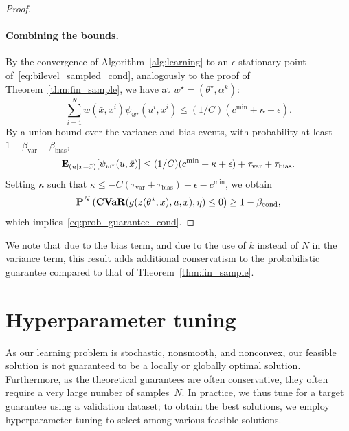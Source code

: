 \documentclass[11pt]{article}
\begin{document}
\begin{proof}
\paragraph{Combining the bounds.}
By the convergence of Algorithm~\ref{alg:learning} to an $\epsilon$-stationary point of~\eqref{eq:bilevel_sampled_cond}, analogously to the proof of Theorem~\ref{thm:fin_sample}, we have at $w^\star = (\theta^\star, \alpha^k)$:
$$\sum_{i=1}^N w(\bar{x}, x^i) \psi_{w^\star}(u^i, x^i) \leq (1/C)(c^{\min} + \kappa + \epsilon).$$
By a union bound over the variance and bias events, with probability at least $1 - \beta_{\mathrm{var}} - \beta_{\mathrm{bias}}$,
$$\mathbf{E}_{(u | x = \bar{x})}[\psi_{w^\star}(u, \bar{x})] \leq (1/C)(c^{\min} + \kappa + \epsilon) + \tau_{\mathrm{var}} +\tau_{\mathrm{bias}} .$$
Setting $\kappa$ such that $\kappa \leq -C(\tau_{\mathrm{var}} + \tau_{\mathrm{bias}} ) - \epsilon - c^{\min}$, we obtain
$${\mathbf P}^{N}\left (\mathop{\bf CVaR}(g(z(\theta^\star,\bar{x}),u,\bar{x}),\eta)\leq 0 \right ) \geq 1 - \beta_{\mathrm{cond}},$$
which implies~\eqref{eq:prob_guarantee_cond}.
\end{proof}

We note that due to the bias term, and due to the use of $k$ instead of $N$ in the variance term, this result adds additional conservatism to the probabilistic guarantee compared to that of Theorem~\ref{thm:fin_sample}.  


\section{Hyperparameter tuning}
\label{sec:hyper}
As our learning problem is stochastic, nonsmooth, and nonconvex, our feasible solution is not guaranteed to be a locally or globally optimal solution. 
Furthermore, as the theoretical guarantees are often conservative, they often require a very large number of samples~$N$. %
In practice, we thus tune for a target guarantee using a validation dataset; to obtain the best solutions, we employ hyperparameter tuning to select among various feasible solutions.
\end{document}

